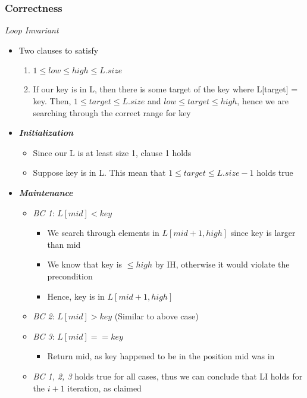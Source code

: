 \documentclass[10pt, 
a4paper, 
oneside, 
headinclude, footinclude, 
BCOR5mm]
{scrartcl}
\begin{document}
\subsubsection{Correctness}
\textit{Loop Invariant}
\begin{itemize}
    \item Two clauses to satisfy
    \begin{enumerate}
        \item $1\leq low\leq high\leq L.size$
        \item If our key is in L, then there is some target of the key where L[target] = key. Then, $1\leq target\leq L.size$ 
        and $low\leq target\leq high$, hence we are searching through the correct range for key
    \end{enumerate}
    \item \textit{\textbf{Initialization}}
    \begin{itemize}
        \item Since our L is at least size 1, clause 1 holds
        \item Suppose key is in L. This mean that $1\leq target\leq L.size-1$ holds true 
    \end{itemize}
    \item \textit{\textbf{Maintenance}}
    \begin{itemize}
        \item \textit{BC 1}: $L[mid] < key$
        \begin{itemize}
            \item We search through elements in $L[mid+1,high]$ since key is larger than mid
            \item We know that key is $\leq high$ by IH, otherwise it would violate the precondition
            \item Hence, key is in $L[mid+1,high]$
        \end{itemize}
        \item \textit{BC 2}: $L[mid] > key$ (Similar to above case)
        \item \textit{BC 3}: $L[mid] == key$
        \begin{itemize}
            \item Return mid, as key happened to be in the position mid was in
        \end{itemize}
        \item \textit{BC 1, 2, 3} holds true for all cases, thus we can conclude that LI holds for the $i+1$ iteration, as claimed
    \end{itemize}

\end{itemize}
\end{document}
